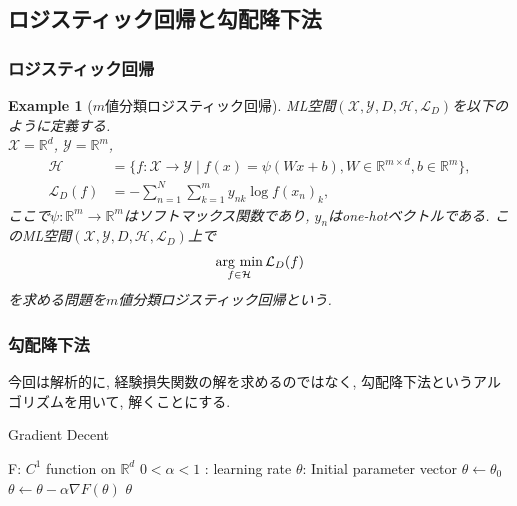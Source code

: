 \documentclass[dvipdfmx,11pt]{beamer}		%
\newtheorem{exam}[defi]{Example}
\newcommand{\R}{\mathbb{R}}
\newcommand{\X}{\mathcal{X}}
\newcommand{\Y}{\mathcal{Y}}
\newcommand{\Hil}{\mathcal{H}}
\newcommand{\Loss}{\mathcal{L}_{D}}
\newcommand{\MLsp}{(\X, \Y, D, \Hil, \Loss)}
\newcommand{\argmin}{\mathop{\rm arg~min}\limits}
\begin{document}
    \subsection{ロジスティック回帰と勾配降下法}
    \begin{frame}
        \frametitle{ロジスティック回帰}
        \begin{exam}[$m$値分類ロジスティック回帰]
            ML空間$\MLsp$を以下のように定義する.\\
            $\X=\R^d$, $\Y = \R^m$,
            \footnotesize 
            \begin{align*}
                \Hil &= \{f:\X\to\Y\mid f(x) = \psi(Wx + b), W\in\R^{m\times d}, b\in\R^m\},\\
                \Loss(f) &= -\sum_{n = 1}^{N}\sum_{k = 1}^{m}y_{nk}\log f(x_n)_{k},
            \end{align*}
            \normalsize
            ここで$\psi:\R^m\to\R^m$はソフトマックス関数であり, $y_{n}$はone-hotベクトルである. このML空間$\MLsp$上で
            \begin{align*}
                \argmin_{f\in\Hil}\Loss(f)
            \end{align*}
            を求める問題を$m$値分類ロジスティック回帰という.
        \end{exam}
    \end{frame}
    \begin{frame}
        \frametitle{勾配降下法}
        今回は解析的に, 経験損失関数の解を求めるのではなく, 勾配降下法というアルゴリズムを用いて, 
        解くことにする. 
        \begin{algorithm}[H]
            \caption{Gradient Decent}
            \begin{algorithmic}
                \REQUIRE F: $C^1$ function on $\R^{d}$
                \REQUIRE $0<\alpha<1$ : learning rate 
                \REQUIRE $\theta$: Initial parameter vector
                \STATE $\theta\leftarrow\theta_{0}$
                \STATE $\theta\leftarrow\theta - \alpha\nabla F(\theta)$ 
                \ENDWHILE
                \RETURN $\theta$
            \end{algorithmic}
        \end{algorithm}
    \end{frame}
\end{document}
